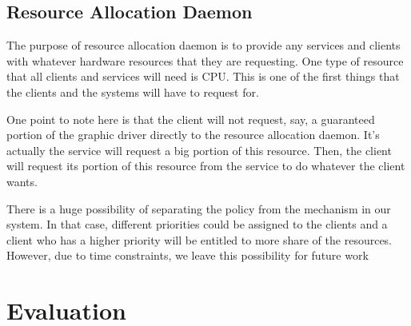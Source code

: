 \documentclass[letterpaper,twocolumn,10pt]{article}
\begin{document}
\subsection{Resource Allocation Daemon}

The purpose of resource allocation daemon is to provide any services and clients with whatever hardware resources that they are requesting. One type of resource that all clients and services will need is CPU. This is one of the first things that the clients and the systems will have to request for.

One point to note here is that the client will not request, say, a guaranteed portion of the graphic driver directly to the resource allocation daemon. It's actually the service will request a big portion of this resource. Then, the client will request its portion of this resource from the service to do whatever the client wants. 

There is a huge possibility of separating the policy from the mechanism in our system. In that case, different priorities could be assigned to the clients and a client who has a higher priority will be entitled to more share of the resources. However, due to time constraints, we leave this possibility for future work

\section{Evaluation}
\end{document}
